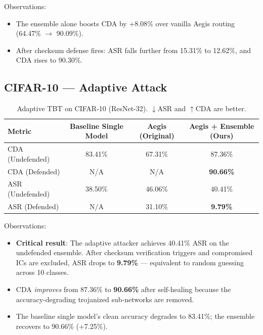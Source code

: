 \documentclass[12pt,a4paper]{article}
\newcommand{\asr}{\textsc{ASR}}
\newcommand{\cda}{\textsc{CDA}}
\newcommand{\tbt}{\textsc{TBT}}
\newcommand{\ic}{\textsc{IC}}
\begin{document}
Observations:
\begin{itemize}
    \item The ensemble alone boosts \cda{} by $+8.08\%$ over vanilla Aegis routing (64.47\% $\to$ 90.09\%).
    \item After checksum defense fires: \asr{} falls further from 15.31\% to 12.62\%, and \cda{} rises to 90.30\%.
\end{itemize}

\subsection{CIFAR-10 --- Adaptive Attack}

\begin{table}[H]
    \centering
    \caption{Adaptive \tbt{} on CIFAR-10 (ResNet-32). $\downarrow$\asr{} and $\uparrow$\cda{} are better.}
    \label{tab:cifar10_adaptive}
    \begin{tabular}{lccc}
        \toprule
        \textbf{Metric} & \textbf{Baseline Single Model} & \textbf{Aegis (Original)} & \textbf{Aegis + Ensemble (Ours)} \\
        \midrule
        \cda{} (Undefended) & 83.41\% & 67.31\% & 87.36\% \\
        \cda{} (Defended)   & N/A     & N/A      & \textbf{90.66\%} \\
        \midrule
        \asr{} (Undefended) & 38.50\% & 46.06\% & 40.41\% \\
        \asr{} (Defended)   & N/A     & 31.10\% & \textbf{9.79\%}  \\
        \bottomrule
    \end{tabular}
\end{table}

Observations:
\begin{itemize}
    \item \textbf{Critical result}: The adaptive attacker achieves 40.41\% \asr{} on the undefended ensemble. After checksum verification triggers and compromised \ic{}s are excluded, \asr{} drops to \textbf{9.79\%} --- equivalent to random guessing across 10 classes.
    \item \cda{} \emph{improves} from 87.36\% to \textbf{90.66\%} after self-healing because the accuracy-degrading trojanized sub-networks are removed.
    \item The baseline single model's clean accuracy degrades to 83.41\%; the ensemble recovers to 90.66\% (+7.25\%).
\end{itemize}
\end{document}
